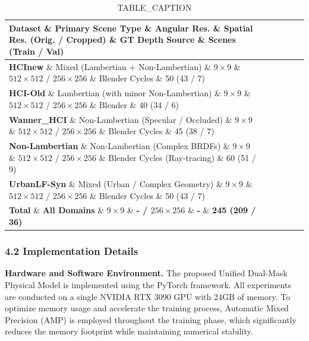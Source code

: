 \documentclass[journal]{IEEEtran}
\begin{document}
\begin{table}[htbp]
\centering
\caption{TABLE_CAPTION}
\begin{tabular}{llllll}
\toprule
Dataset \& Primary Scene Type \& Angular Res. \& Spatial Res. (Orig. / Cropped) \& GT Depth Source \& Scenes (Train / Val) \\
\midrule
\textbf{HCInew} \& Mixed (Lambertian + Non-Lambertian) \& \(9 \times 9\) \& \(512 \times 512\) / \(256 \times 256\) \& Blender Cycles \& 50 (43 / 7) \\
\textbf{HCI-Old} \& Lambertian (with minor Non-Lambertian) \& \(9 \times 9\) \& \(512 \times 512\) / \(256 \times 256\) \& Blender \& 40 (34 / 6) \\
\textbf{Wanner_HCI} \& Non-Lambertian (Specular / Occluded) \& \(9 \times 9\) \& \(512 \times 512\) / \(256 \times 256\) \& Blender Cycles \& 45 (38 / 7) \\
\textbf{Non-Lambertian} \& Non-Lambertian (Complex BRDFs) \& \(9 \times 9\) \& \(512 \times 512\) / \(256 \times 256\) \& Blender Cycles (Ray-tracing) \& 60 (51 / 9) \\
\textbf{UrbanLF-Syn} \& Mixed (Urban / Complex Geometry) \& \(9 \times 9\) \& \(512 \times 512\) / \(256 \times 256\) \& Blender Cycles \& 50 (43 / 7) \\
\textbf{Total} \& \textbf{All Domains} \& \textbf{\(9 \times 9\)} \& \textbf{- / \(256 \times 256\)} \& \textbf{-} \& \textbf{245 (209 / 36)} \\
\bottomrule
\end{tabular}
\end{table}
\subsubsection{4.2 Implementation Details}

\textbf{Hardware and Software Environment.} 
The proposed Unified Dual-Mask Physical Model is implemented using the PyTorch framework. All experiments are conducted on a single NVIDIA RTX 3090 GPU with 24GB of memory. To optimize memory usage and accelerate the training process, Automatic Mixed Precision (AMP) is employed throughout the training phase, which significantly reduces the memory footprint while maintaining numerical stability.
\end{document}
